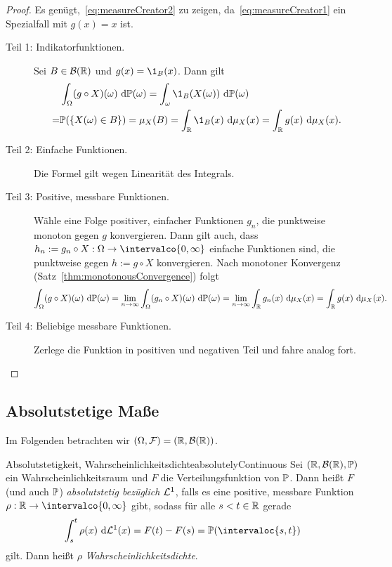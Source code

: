\documentclass[language=ngerman]{../../Template/TemplateLecture}
\begin{document}
\begin{proof}
    Es genügt,~\eqref{eq:measureCreator2} zu zeigen, da~\eqref{eq:measureCreator1} ein Spezialfall mit $g(x) = x$ ist.

    \begin{description}
        \item[Teil 1: Indikatorfunktionen.] Sei $B \in \mathcal{B}(\mathbb{R})$ und $g(x) = \1_B(x)$. Dann gilt 
        \begin{equation}
            \begin{split}
                &\int_\Omega (g \circ X)(\omega) \dd\IP(\omega) = \int_\omega \1_B(X(\omega)) \dd\IP(\omega) \\
                =& \IP(\set{X(\omega) \in B}) = \mu_X(B) = \int_\IR \1_B(x) \dd\mu_X(x) = \int_\IR g(x) \dd\mu_X(x).
            \end{split}
        \end{equation} 
        \item[Teil 2: Einfache Funktionen.] Die Formel gilt wegen Linearität des Integrals.
        \item[Teil 3: Positive, messbare Funktionen.] Wähle eine Folge positiver, einfacher Funktionen $g_n$, die punktweise monoton gegen $g$ konvergieren. Dann gilt auch, dass $h_n := g_n \circ X: \Omega \to \intervalco{0,\infty}$ einfache Funktionen sind, die punktweise gegen $h := g \circ X$ konvergieren. Nach monotoner Konvergenz (Satz~\ref{thm:monotonousConvergence}) folgt 
        \begin{equation}
            \int_\Omega (g \circ X)(\omega)~\mathrm{d}\mathbb{P}(\omega) = \lim_{n \to \infty} \int_\Omega (g_n \circ X)(\omega)~\mathrm{d}\mathbb{P}(\omega) = \lim_{n \to \infty} \int_{\mathbb{R}} g_n(x) ~\mathrm{d}\mu_X(x) = \int_{\mathbb{R}} g(x) ~\mathrm{d}\mu_X(x).
        \end{equation}
        \item[Teil 4: Beliebige messbare Funktionen.] Zerlege die Funktion in positiven und negativen Teil und fahre analog fort.
    \end{description}
\end{proof}





\subsection{Absolutstetige Maße}
Im Folgenden betrachten wir $(\Omega,\mathcal{F}) = (\mathbb{R}, \mathcal{B}(\mathbb{R}))$.

\begin{defi}{Absolutstetigkeit, Wahrscheinlichkeitsdichte}{absolutelyContinuous}
    Sei $(\mathbb{R}, \mathcal{B}(\mathbb{R}), \mathbb{P})$ ein Wahrscheinlichkeitsraum und $F$ die Verteilungsfunktion von $\mathbb{P}$. Dann heißt $F$ (und auch $\mathbb{P}$) \emph{absolutstetig bezüglich $\mathcal{L}^1$}, falls es eine positive, messbare Funktion $\rho: \IR \to \intervalco{0,\infty}$ gibt, sodass für alle $s < t \in \mathbb{R}$ gerade 
    \begin{equation}
        \int_s^t \rho(x) \dd\cL^1(x) = F(t) - F(s) = \IP(\intervaloc{s,t})
    \end{equation}
    gilt. Dann heißt $\rho$ \emph{Wahrscheinlichkeitsdichte}.
\end{defi}
\end{document}

